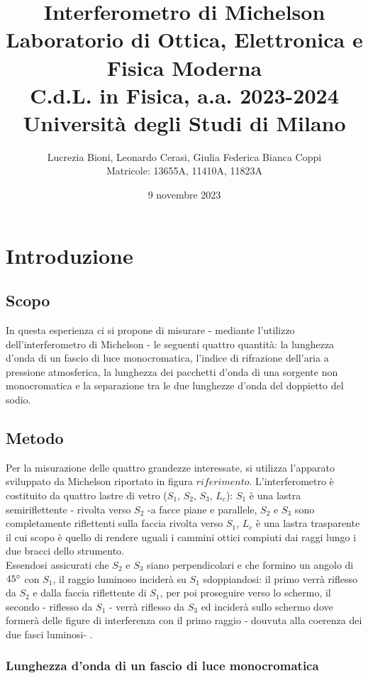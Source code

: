 \documentclass[]{article}
\title{%
    \Huge Interferometro di Michelson \\
    \Large Laboratorio di Ottica, Elettronica e Fisica Moderna \\ C.d.L. in Fisica, a.a. 2023-2024 \\ Università degli Studi di Milano}
\author{\LARGE Lucrezia Bioni, Leonardo Cerasi, Giulia Federica Bianca Coppi \\ Matricole: 13655A, 11410A, 11823A}
\date{9 novembre 2023}
\let\oldsection\section%
\renewcommand{\section}{%
	\renewcommand{\theequation}{\thesection.\arabic{equation}}%
	\oldsection}%
\let\oldsubsection\subsection%
\renewcommand{\subsection}{%
	\renewcommand{\theequation}{\thesubsection.\arabic{equation}}%
	\oldsubsection}%
\begin{document}
\maketitle

\section{Introduzione}

\subsection{Scopo}

In questa esperienza ci si propone di misurare - mediante l'utilizzo dell'interferometro di Michelson - le seguenti quattro quantità: la lunghezza d'onda di un fascio di luce monocromatica, l'indice di rifrazione dell'aria a pressione atmosferica, la lunghezza dei pacchetti d'onda di una sorgente non monocromatica e la separazione tra le due lunghezze d'onda del doppietto del sodio.

\subsection{Metodo}

Per la misurazione delle quattro grandezze interessate, si utilizza l'apparato sviluppato da Michelson riportato in figura $riferimento$. L'interferometro è costituito da quattro lastre di vetro ($S_1, \, S_2, \, S_3, \, L_c$): $S_1$ è una lastra semiriflettente - rivolta verso $S_2$ -a facce piane e parallele, $S_2$ e $S_3$ sono completamente riflettenti sulla faccia rivolta verso $S_1$, $L_c$ è una lastra trasparente il cui scopo è quello di rendere uguali i cammini ottici compiuti dai raggi lungo i due bracci dello strumento. \\ Essendosi assicurati che $S_2$ e $S_3$ siano perpendicolari e che formino un angolo di $45\degree$ con $S_1$, il raggio luminoso inciderà su $S_1$ sdoppiandosi: il primo verrà riflesso da $S_2$ e dalla faccia riflettente di $S_1$, per poi proseguire verso lo schermo, il secondo - riflesso da $S_1$ - verrà riflesso da $S_3$ ed inciderà sullo schermo dove formerà delle figure di interferenza con il primo raggio - douvuta alla coerenza dei due fasci luminosi- .

\subsubsection{Lunghezza d'onda di un fascio di luce monocromatica}
\end{document}
